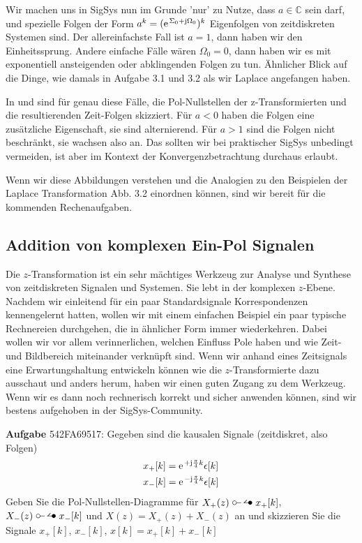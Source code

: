 Wir machen uns in SigSys nun im Grunde 'nur' zu Nutze, dass $a\in\mathbb{C}$
sein darf, und spezielle Folgen der Form $a^k=(\e^{\Sigma_0 +\im\Omega_0})^k$
Eigenfolgen von zeitdiskreten Systemen sind.
%
Der allereinfachste Fall ist $a=1$, dann haben wir den Einheitssprung.
%
Andere einfache Fälle wären $\Omega_0=0$, dann haben wir es mit exponentiell
ansteigenden oder abklingenden Folgen zu tun.
Ähnlicher Blick auf die Dinge, wie damals in Aufgabe 3.1 und 3.2 als wir
Laplace angefangen haben.

In  und
sind für genau diese Fälle, die Pol-Nullstellen der z-Transformierten
und die resultierenden Zeit-Folgen skizziert.
%
Für $a<0$ haben die Folgen eine zusätzliche Eigenschaft, sie sind alternierend.
Für $a>1$ sind die Folgen nicht beschränkt, sie wachsen also an. Das sollten wir
bei praktischer SigSys unbedingt vermeiden, ist aber im Kontext der
Konvergenzbetrachtung durchaus erlaubt.

Wenn wir diese Abbildungen verstehen und die Analogien zu den Beispielen
der Laplace Transformation Abb. 3.2 einordnen können, sind wir bereit für
die kommenden Rechenaufgaben.








\newpage
\subsection{Addition von komplexen Ein-Pol Signalen}
\label{sec:542FA69517}
\begin{Ziel}
Die $z$-Transformation ist ein sehr mächtiges Werkzeug zur Analyse und Synthese
von zeitdiskreten Signalen und Systemen. Sie lebt in der komplexen $z$-Ebene.
Nachdem wir einleitend für ein paar Standardsignale Korrespondenzen
kennengelernt hatten, wollen wir mit einem einfachen Beispiel ein paar
typische Rechnereien durchgehen, die in ähnlicher Form immer wiederkehren.
Dabei wollen wir vor allem verinnerlichen, welchen Einfluss Pole haben
und wie Zeit- und Bildbereich miteinander verknüpft sind. Wenn wir anhand
eines Zeitsignals eine Erwartungshaltung entwickeln können wie die $z$-Transformierte
dazu ausschaut und anders herum, haben wir einen guten Zugang zu dem Werkzeug.
Wenn wir es dann noch rechnerisch korrekt und sicher anwenden können, sind wir
bestens aufgehoben in der SigSys-Community.
\end{Ziel}
\textbf{Aufgabe} {\tiny 542FA69517}:
Gegeben sind die kausalen Signale (zeitdiskret, also Folgen)
\begin{align}
&x_+[k]=\e^{+\im\frac{\pi}{4} k} \epsilon[k]\\
&x_-[k]=\e^{-\im\frac{\pi}{4} k} \epsilon[k]
\end{align}
Geben Sie die Pol-Nullstellen-Diagramme für
$X_+(z) \ztransf x_+[k]$,
$X_-(z) \ztransf x_-[k]$ und
$X(z) = X_+(z) + X_-(z)$ an und skizzieren Sie die Signale
$x_+[k]$, $x_-[k]$, $x[k]=x_+[k]+x_-[k]$

